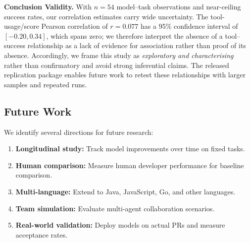 \textbf{Conclusion Validity.} With $n=54$ model--task observations and near-ceiling success rates, our correlation estimates carry wide uncertainty. The tool-usage/score Pearson correlation of $r=0.077$ has a 95\% confidence interval of $[-0.20, 0.34]$, which spans zero; we therefore interpret the absence of a tool--success relationship as a lack of evidence for association rather than proof of its absence. Accordingly, we frame this study as \emph{exploratory and characterising} rather than confirmatory and avoid strong inferential claims. The released replication package \cite{our_dataset} enables future work to retest these relationships with larger samples and repeated runs.

\subsection{Future Work}

We identify several directions for future research:

\begin{enumerate}
    \item \textbf{Longitudinal study:} Track model improvements over time on fixed tasks.
    \item \textbf{Human comparison:} Measure human developer performance for baseline comparison.
    \item \textbf{Multi-language:} Extend to Java, JavaScript, Go, and other languages.
    \item \textbf{Team simulation:} Evaluate multi-agent collaboration scenarios.
    \item \textbf{Real-world validation:} Deploy models on actual PRs and measure acceptance rates.
\end{enumerate}
